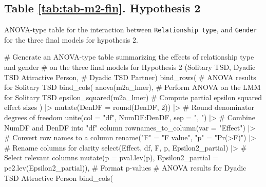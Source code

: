 \documentclass[
  bookmarksnumbered]{article}
\newenvironment{Shaded}{\begin{snugshade}}{\end{snugshade}}
\newcommand{\AttributeTok}[1]{\textcolor[rgb]{0.80,0.80,0.80}{#1}}
\newcommand{\CommentTok}[1]{\textcolor[rgb]{0.50,0.62,0.50}{#1}}
\newcommand{\DecValTok}[1]{\textcolor[rgb]{0.86,0.86,0.80}{#1}}
\newcommand{\FunctionTok}[1]{\textcolor[rgb]{0.94,0.94,0.56}{#1}}
\newcommand{\NormalTok}[1]{\textcolor[rgb]{0.80,0.80,0.80}{#1}}
\newcommand{\OtherTok}[1]{\textcolor[rgb]{0.94,0.94,0.56}{#1}}
\newcommand{\SpecialCharTok}[1]{\textcolor[rgb]{0.86,0.64,0.64}{#1}}
\newcommand{\StringTok}[1]{\textcolor[rgb]{0.80,0.58,0.58}{#1}}
\begin{document}
\subsection{Table \ref{tab:tab-m2-fin}. Hypothesis 2}\label{table-reftabtab-m2-fin.-hypothesis-2}

ANOVA-type table for the interaction between \texttt{Relationship\ type}, and \texttt{Gender} for the three final models for hypothesis 2.

\begin{Shaded}
\begin{Highlighting}[]
\CommentTok{\# Generate an ANOVA{-}type table summarizing the effects of relationship type and gender}
\CommentTok{\# on the three final models for Hypothesis 2 (Solitary TSD, Dyadic TSD Attractive Person,}
\CommentTok{\# Dyadic TSD Partner)}
\FunctionTok{bind\_rows}\NormalTok{(}
  \CommentTok{\# ANOVA results for Solitary TSD}
  \FunctionTok{bind\_cols}\NormalTok{(}
    \FunctionTok{anova}\NormalTok{(m2a\_lmer), }\CommentTok{\# Perform ANOVA on the LMM for Solitary TSD}
    \FunctionTok{epsilon\_squared}\NormalTok{(m2a\_lmer) }\CommentTok{\# Compute partial epsilon squared effect sizes}
\NormalTok{  ) }\SpecialCharTok{|\textgreater{}}
    \FunctionTok{mutate}\NormalTok{(}\AttributeTok{DenDF =} \FunctionTok{round}\NormalTok{(DenDF, }\DecValTok{2}\NormalTok{)) }\SpecialCharTok{|\textgreater{}} \CommentTok{\# Round denominator degrees of freedom}
    \FunctionTok{unite}\NormalTok{(}\AttributeTok{col =} \StringTok{"df"}\NormalTok{, NumDF}\SpecialCharTok{:}\NormalTok{DenDF, }\AttributeTok{sep =} \StringTok{", "}\NormalTok{) }\SpecialCharTok{|\textgreater{}} \CommentTok{\# Combine NumDF and DenDF into "df" column}
    \FunctionTok{rownames\_to\_column}\NormalTok{(}\AttributeTok{var =} \StringTok{"Effect"}\NormalTok{) }\SpecialCharTok{|\textgreater{}} \CommentTok{\# Convert row names to a column}
    \FunctionTok{rename}\NormalTok{(}\StringTok{"F"} \OtherTok{=} \StringTok{"F value"}\NormalTok{, }\StringTok{"p"} \OtherTok{=} \StringTok{"Pr(\textgreater{}F)"}\NormalTok{) }\SpecialCharTok{|\textgreater{}} \CommentTok{\# Rename columns for clarity}
    \FunctionTok{select}\NormalTok{(Effect, df, F, p, Epsilon2\_partial) }\SpecialCharTok{|\textgreater{}} \CommentTok{\# Select relevant columns}
    \FunctionTok{mutate}\NormalTok{(}\AttributeTok{p =} \FunctionTok{pval.lev}\NormalTok{(p), }\AttributeTok{Epsilon2\_partial =} \FunctionTok{pe2.lev}\NormalTok{(Epsilon2\_partial)), }\CommentTok{\# Format p{-}values}
  \CommentTok{\# ANOVA results for Dyadic TSD Attractive Person}
  \FunctionTok{bind\_cols}\NormalTok{(}

\end{Highlighting}
\end{Shaded}
\end{document}
